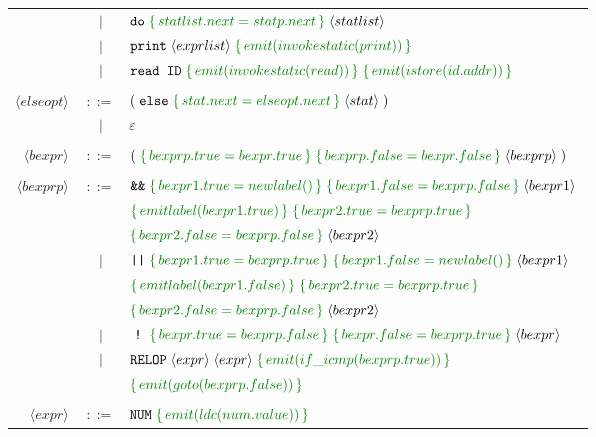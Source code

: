 \documentclass[a4paper]{article}
\newcommand{\cmd}[1]{\textcolor{MyGreen}{\{\, #1 \,\}} \;}
\newcommand{\node}[1]{\langle #1 \rangle \;}
\newcommand{\tag}[1]{\texttt{#1} \;}
\begin{document}
\begin{center}
\begin{tabular}{ r c l }
                      &  $|$  & $\tag{do} \cmd{statlist.next = statp.next} \node{statlist}$ \\

                      &  $|$  & $\tag{print} \node{exprlist} \cmd{emit(invokestatic(print))}$ \\

                      &  $|$  & $\texttt{read ID}\; \cmd{emit(invokestatic(read))} \cmd{emit(istore(id.addr))}$ \\\\
  $\node{elseopt}$    & $::=$ & $(\; \tag{else} \cmd{stat.next = elseopt.next} \node{stat})$ \\
                      &  $|$  & $\varepsilon$ \\\\
  $\node{bexpr}$      & $::=$ & $(\; \cmd{bexprp.true = bexpr.true} \cmd{bexprp.false = bexpr.false} \node{bexprp} )$ \\\\
  $\node{bexprp}$     & $::=$ & $\tag{\&\&} \cmd{bexpr1.true = newlabel()} \cmd{bexpr1.false = bexprp.false} \node{bexpr1}$ \\
                      &       & $\cmd{emitlabel(bexpr1.true)} \cmd{bexpr2.true = bexprp.true}$ \\
                      &       & $\cmd{bexpr2.false = bexprp.false} \node{bexpr2}$ \\

                      &  $|$  & $\tag{||} \cmd{bexpr1.true = bexprp.true} \cmd{bexpr1.false = newlabel()} \node{bexpr1}$ \\
                      &       & $\cmd{emitlabel(bexpr1.false)} \cmd{bexpr2.true = bexprp.true}$ \\
                      &       & $\cmd{bexpr2.false = bexprp.false} \node{bexpr2}$ \\
                      &  $|$  & $\;\tag{!}\; \cmd{bexpr.true = bexprp.false} \cmd{bexpr.false = bexprp.true} \node{bexpr}$ \\
                      &  $|$  & $\tag{RELOP} \node{expr} \node{expr} \cmd{emit(if\_icmp(bexprp.true))}$ \\
                      &       & $\cmd{emit(goto(bexprp.false))}$ \\\\
  $\node{expr}$       & $::=$ & $\tag{NUM} \cmd{emit(ldc(num.value))}$ \\


\end{tabular}
\end{center}
\end{document}
